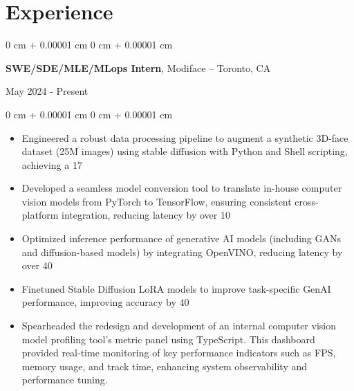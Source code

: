 \documentclass[11pt, letterpaper]{article}
\newenvironment{highlights}{
    \begin{itemize}[
        topsep=0.08 cm,
        parsep=0.08 cm,
        partopsep=0pt,
        itemsep=0pt,
        leftmargin=0.2 cm + 17pt
    ]
}
{
    \end{itemize}
}
\newenvironment{onecolentry}{
    \begin{adjustwidth}{
        0 cm + 0.00001 cm
    }{
        0 cm + 0.00001 cm
    }
}{
    \end{adjustwidth}
}
\newenvironment{twocolentry}[2][]{
    \onecolentry
    \def\secondColumn{#2}
    \setcolumnwidth{\fill, 4.5 cm}
    \begin{paracol}{2}
}{
    \switchcolumn \raggedleft \secondColumn
    \end{paracol}
    \endonecolentry
}
\begin{document}
\section{Experience}
\vspace{0.08 cm}
\begin{twocolentry}{May 2024 - Present}
    {\textbf{SWE/SDE/MLE/MLops Intern}}, Modiface -- Toronto, CA
\end{twocolentry}
\vspace{0.05 cm}
\begin{onecolentry}
    \begin{highlights}
        \item Engineered a robust data processing pipeline to augment a synthetic 3D-face dataset (25M images) using stable diffusion with Python and Shell scripting, achieving a 17%
        \item Developed a seamless model conversion tool to translate in-house computer vision models from PyTorch to TensorFlow, ensuring consistent cross-platform integration, reducing latency by over 10%
        \item Optimized inference performance of generative AI models (including GANs and diffusion-based models) by integrating OpenVINO, reducing latency by over 40%
        \item Finetuned Stable Diffusion LoRA models to improve task-specific GenAI performance, improving accuracy by 40%
        \item Spearheaded the redesign and development of an internal computer vision model profiling tool's metric panel using TypeScript. This dashboard provided real-time monitoring of key performance indicators such as FPS, memory usage, and track time, enhancing system observability and performance tuning.
    \end{highlights}
\end{onecolentry}
\vspace{0.15 cm}
\end{document}

